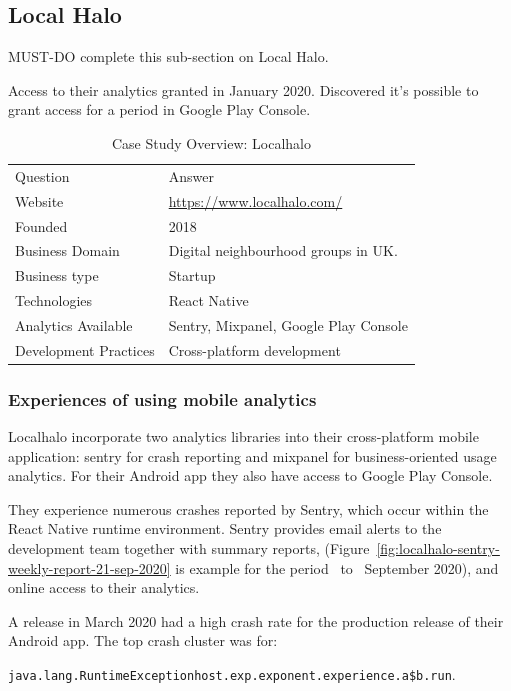 \subsection{Local Halo}
MUST-DO complete this sub-section on Local Halo.

Access to their analytics granted in January 2020. Discovered it's possible to grant access for a period in Google Play Console. 

\begin{table}[htbp!]
    \centering
    \small
    \begin{tabular}{ll}
       Question &Answer  \\
       Website &\url{https://www.localhalo.com/} \\
       Founded &2018\\
       Business Domain &Digital neighbourhood groups in UK.\\
       Business type &Startup \\
       Technologies  &React Native \\
       Analytics Available &Sentry, Mixpanel, Google Play Console \\
       Development Practices &Cross-platform development
    \end{tabular}
    \caption{Case Study Overview: Localhalo}
    \label{tab:local_halo_anaytics_overview}
\end{table}

\subsubsection{Experiences of using mobile analytics}
Localhalo incorporate two analytics libraries into their cross-platform mobile application: sentry for crash reporting and mixpanel for business-oriented usage analytics. For their Android app they also have access to Google Play Console.

They experience numerous crashes reported by Sentry, which occur within the React Native runtime environment. Sentry provides email alerts to the development team together with summary reports, (Figure~\ref{fig:localhalo-sentry-weekly-report-21-sep-2020} is example for the period~ to~ September 2020), and online access to their analytics.

A release in March 2020 had a high crash rate for the production release of their Android app. The top crash cluster was for:

\texttt{java.lang.RuntimeExceptionhost.exp.exponent.experience.a\$b.run}. 

